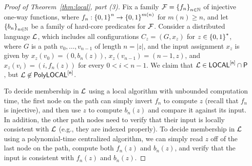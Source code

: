 \begin{proof}[Proof of Theorem~\ref{thm:local}, part (3)]
	Fix a family $\mathcal{F} = \left \{{ f_n } \right \}_{n \in \mathbb{N}}$ of injective one-way functions,
	where $f_n : \left \{{0,1} \right \}^n \rightarrow \left \{{0,1} \right \}^{m(n)}$ for $m(n) \geq n$,
	and let $\left \{{ b_n } \right \}_{n \in \mathbb{N}}$ be a family of hard-core predicates for $\mathcal{F}$.
	Consider a distributed language $\mathcal{L}$, which includes all configurations $C_z = (G, x_z)$ for $z \in \left \{{0,1} \right \}^{\ast}$,
	where $G$ is a path $v_0,\ldots,v_{n-1}$ of length $n = |z|$,
	and the input assignment $x_z$ is given by
	$x_z(v_0) = (0, b_n(z))$,
	$x_z(v_{n-1}) = (n-1, z)$,
	and $x_z(v_i) = (i, f_n(z))$ for every $0 < i < n-1$.
	We claim that $\mathcal{L} \in {\mathsf{LOCAL}}^{[\mathsf{n}]} \cap {\mathsf{P}}$, but $\mathcal{L} \not \in \mathsf{PolyLOCAL}^{[\mathsf{n}]}$.

	To decide membership in $\mathcal{L}$ using a local algorithm with unbounded computation time,
	the first node on the path can simply invert $f_n$ to compute $z$ (recall that $f_n$
	is injective),
	and then use $z$ to compute $b_n(z)$ and compare it against
	its input. In addition, the other path nodes
	need to verify that their input is locally consistent with $\mathcal{L}$
	(e.g., they are indexed properly).
%
	To decide membership in $\mathcal{L}$ using a polynomial-time centralized algorithm,
	we can simply read $z$ off of the last node on the path, compute both $f_n(z)$ and $b_n(z)$,
	and verify that the input is consistent with $f_n(z)$ and $b_n(z)$.



\end{proof}
